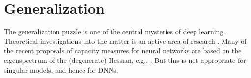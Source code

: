 \documentclass{article} %
\def\lto{\longrightarrow}
\begin{document}


\section{Generalization}\label{section:gen_error}
The generalization puzzle \citep{DBLP:journals/corr/abs-1801-00173} is one of the central mysteries of deep learning. Theoretical investigations into the matter is an active area of research \cite{neyshabur_exploring_2017}. Many of the recent proposals of capacity measures for neural networks are based on the eigenspectrum of the (degenerate) Hessian, e.g., \citet{thomas_information_2019, maddox_rethinking_2020}. But this is not appropriate for singular models, and hence for DNNs.
\end{document}
